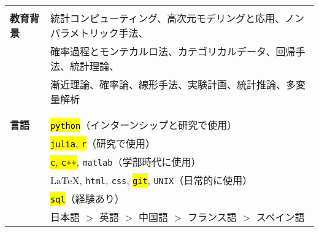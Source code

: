 \documentclass[utf8,letterpaper,oneside]{article}
\begin{document}
\begin{center}
\begin{tabular}{l l}
                      &                                                                                                \\
  \textbf{教育背景}   & 統計コンピューティング、高次元モデリングと応用、ノンパラメトリック手法、                       \\
                      & 確率過程とモンテカルロ法、カテゴリカルデータ、回帰手法、統計理論、                             \\
                      & 漸近理論、確率論、線形手法、実験計画、統計推論、多変量解析                                     \\
                      &                                                                                                \\ \hline
                      &                                                                                                \\
  \textbf{言語}       & \hl{\texttt{python}}（インターンシップと研究で使用）                                           \\
                      & \hl{\texttt{julia}, \texttt{r}}（研究で使用）                                                  \\
                      & \hl{\texttt{c}, \texttt{c++}}, \texttt{matlab}（学部時代に使用）                               \\
                      & \LaTeX, \texttt{html}, \texttt{css}, \hl{\texttt{git}}, \texttt{UNIX}（日常的に使用）          \\
                      & \hl{\texttt{sql}}（経験あり）                                                                  \\
                      & 日本語 $>$ 英語 $>$ 中国語 $>$ フランス語 $>$ スペイン語                                       \\
 \end{tabular}
\end{center}
\end{document}
